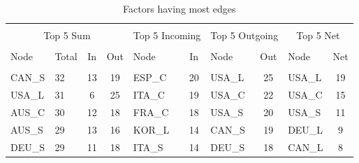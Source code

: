 \documentclass[12pt,bibliography=totoc]{article}
\begin{document}
\begin{table}[h]

\fontsize{10}{10}\selectfont
\setlength{\tabcolsep}{10pt}
\centering%
\begin{tabular}{l  lcc  lc lc  lc}%

\hline\hline \\ [-1.5ex]                         %


\multicolumn{4}{c}{Top 5 Sum}			&	\multicolumn{2}{c}{Top 5 Incoming}&	\multicolumn{2}{c}{Top 5 Outgoing}&	\multicolumn{2}{c}{Top 5 Net}	\\	
\hline \\ [-1.5ex]    
Node	&	Total 	&	In	&	Out	&	Node	&	In	&	Node	&	Out	&	Node	&	Net	\\
\hline \\ [-1.5ex]    
CAN\_S 	&	32	&	13	&	19	&	ESP\_C	&	20	&	USA\_L	&	25	&	USA\_L	&	19	\\
USA\_L	&	31	&	6	&	25	&	ITA\_C	&	19	&	USA\_C	&	22	&	USA\_C	&	15	\\
AUS\_C	&	30	&	12	&	18	&	FRA\_C	&	18	&	USA\_S	&	20	&	USA\_S	&	11	\\
AUS\_S	&	29	&	13	&	16	&	KOR\_L	&	14	&	CAN\_S	&	19	&	DEU\_L	&	9	\\
DEU\_S	&	29	&	11	&	18	&	ITA\_S	&	14	&	DEU\_S	&	18	&	CAN\_L	&	8	\\

\hline            
\end{tabular}


\caption{Factors having most edges} %
\label{tab:mostEdges}

\end{table}


\end{document}
